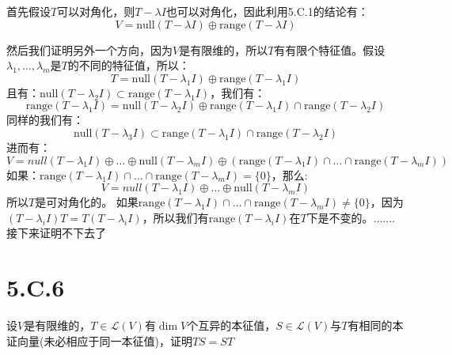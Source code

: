 \documentclass[10pt,a4paper,UTF8]{article}
\begin{document}
\begin{answer}
首先假设\(T\)可以对角化，则\(T-\lambda I\)也可以对角化，因此利用5.C.1的结论有：
\begin{equation}
\label{eq:2}
V= \mathrm{null}(T-\lambda I) \oplus \mathrm{range}(T-\lambda I)
\end{equation}

然后我们证明另外一个方向，因为\(V\)是有限维的，所以\(T\)有有限个特征值。假设\(\lambda_{1},\ldots ,\lambda_{m}\)是\(T\)的不同的特征值，所以：
\begin{equation}
\label{eq:3}
T = \mathrm{null}(T-\lambda_{1} I) \oplus \mathrm{range}(T-\lambda_{1} I)
\end{equation}
且有：\(\mathrm{null}(T-\lambda_{2}I) \subset \mathrm{range}(T-\lambda_{1} I)\)，我们有：
\begin{equation}
\label{eq:4}
\mathrm{range}(T-\lambda_{1}I) = \mathrm{null}(T-\lambda_{2} I)\oplus \mathrm{range}(T-\lambda_{1}I)\cap \mathrm{range}(T-\lambda_{2}I)
\end{equation}
同样的我们有：
\begin{equation}
\label{eq:5}
\mathrm{null}(T-\lambda_{3}I)\subset \mathrm{range}(T-\lambda_{1}I)\cap \mathrm{range}(T-\lambda_{2}I)
\end{equation}
进而有：
\begin{equation}
\label{eq:6}
V = null(T-\lambda_{1}I)\oplus \ldots \oplus \mathrm{null}(T-\lambda_{m}I) \oplus (\mathrm{range}(T-\lambda_{1}I) \cap \ldots \cap \mathrm{range}(T-\lambda_{m}I))
\end{equation}
如果：\(\mathrm{range}(T-\lambda_{1}I) \cap \ldots \cap \mathrm{range}(T-\lambda_{m}I) = \{0\}\)，那么:
\begin{equation}
\label{eq:7}
V = null(T-\lambda_{1}I)\oplus \ldots \oplus \mathrm{null}(T-\lambda_{m}I)
\end{equation}
所以\(T\)是可对角化的。
如果\(\mathrm{range}(T-\lambda_{1}I) \cap \ldots \cap \mathrm{range}(T-\lambda_{m}I) \neq \{0\}\)，因为\((T-\lambda_{i}I)T = T(T-\lambda_{i}I)\)，所以我们有\(\mathrm{range}(T-\lambda_{i}I)\)在\(T\)下是不变的。\(.......\)接下来证明不下去了
\end{answer}
\section{5.C.6}
\label{sec:org301aad0}


\begin{problem}
设\(V\)是有限维的，\(T\in \mathcal{L}(V)\)有\(\dim V\)个互异的本征值，\(S\in \mathcal{L}(V)\)与\(T\)有相同的本证向量(未必相应于同一本征值)，证明\(TS = ST\)
\end{problem}
\end{document}
